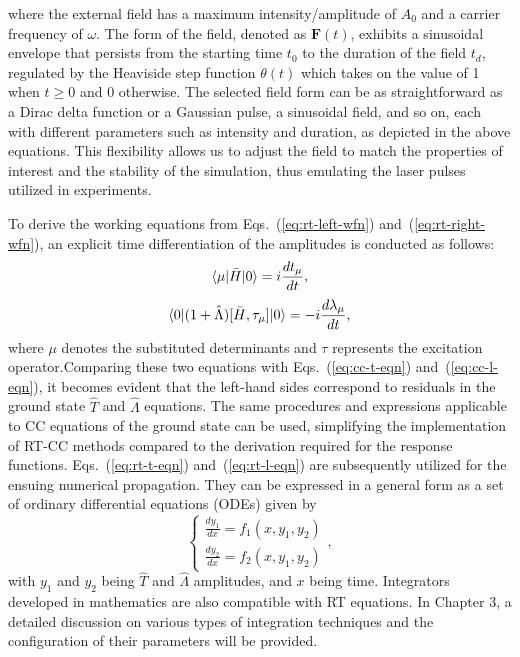 where the external field has a maximum intensity/amplitude of $A_{0}$ and a carrier frequency of $\omega$. The form of the field, denoted as $\textbf{F}(t)$, exhibits a sinusoidal envelope that persists from the starting time $t_{0}$ to the duration of the field $t_{d}$, regulated by the Heaviside step function $\theta(t)$ which takes on the value of 1 when $t \ge 0$ and 0 otherwise. The selected field form can be as straightforward as a Dirac delta function\cite{Dirac1927function, Morse1951} or a Gaussian pulse, a sinusoidal field, and so on, each with different parameters such as intensity and duration, as depicted in the above equations. This flexibility allows us to adjust the field to match the properties of interest and the stability of the simulation, thus emulating the laser pulses utilized in experiments.

To derive the working equations from Eqs.~(\ref{eq:rt-left-wfn}) and~(\ref{eq:rt-right-wfn}), an explicit time differentiation of the amplitudes is conducted as follows: 
\begin{equation}
\langle\mu |\bar{H}| 0 \rangle=i\frac{dt_{\mu}}{dt},
\label{eq:rt-t-eqn}
\end{equation}
\begin{equation}
\langle0 |(1 + \hat{\Lambda})[\bar{H}, \tau_{\mu}]| 0 \rangle = -i\frac{d\lambda_{\mu}}{dt},
\label{eq:rt-l-eqn}
\end{equation}
where $\mu$ denotes the substituted determinants and $\tau$ represents the excitation operator.Comparing these two equations with Eqs.~(\ref{eq:cc-t-eqn}) and~(\ref{eq:cc-l-eqn}), it becomes evident that the left-hand sides correspond to residuals in the ground state $\hat{T}$ and $\hat{\Lambda}$ equations. The same procedures and expressions applicable to CC equations of the ground state can be used, simplifying the implementation of RT-CC methods compared to the derivation required for the response functions. Eqs.~(\ref{eq:rt-t-eqn}) and~(\ref{eq:rt-l-eqn}) are subsequently utilized for the ensuing numerical propagation. They can be expressed in a general form as a set of ordinary differential equations (ODEs) given by 
\begin{equation}
\begin{cases}
\frac{dy_{1}}{dx}=f_{1}(x, y_{1} , y_{2})\\
\frac{dy_{2}}{dx}=f_{2}(x, y_{1} , y_{2})
\end{cases},
\end{equation}
with $y_{1}$ and $y_{2}$ being $\hat{T}$ and $\hat{\Lambda}$ amplitudes, and $x$ being time. Integrators developed in mathematics are also compatible with RT equations. In Chapter 3, a detailed discussion on various types of integration techniques and the configuration of their parameters will be provided.

